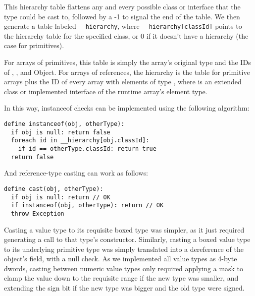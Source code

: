 \documentclass{article}
\begin{document}
This hierarchy table flattens any and every possible class or interface that the type could be cast to, followed by a -1
to signal the end of the table. We then generate a table labeled \texttt{\_\_hierarchy}, where
\texttt{\_\_hierarchy[classId]} points to the hierarchy table for the specified class, or 0 if it doesn't have a
hierarchy (the case for primitives).

For arrays of primitives, this table is simply the array's original type and the IDs of ,
, and Object. For arrays of references, the hierarchy is the table for primitive arrays plus the ID
of every array with elements of type , where  is an extended class or implemented interface of the
runtime array's element type.

In this way, instanceof checks can be implemented using the following algorithm:

\begin{lstlisting}
define instanceof(obj, otherType):
  if obj is null: return false
  foreach id in __hierarchy[obj.classId]:
    if id == otherType.classId: return true
  return false
\end{lstlisting}

And reference-type casting can work as follows:

\begin{lstlisting}
define cast(obj, otherType):
  if obj is null: return // OK
  if instanceof(obj, otherType): return // OK
  throw Exception
\end{lstlisting}

Casting a value type to its requisite boxed type was simpler, as it just required generating a call to that type's
constructor. Similarly, casting a boxed value type to its underlying primitive type was simply translated into a
dereference of the object's  field, with a null check.  As we implemented all value types as 4-byte dwords,
casting between numeric value types only required applying a mask to clamp the value down to the requisite range if the
new type was smaller, and extending the sign bit if the new type was bigger and the old type were signed.
\end{document}
